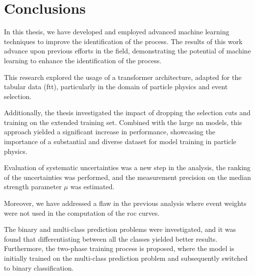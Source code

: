 \chapter*{Conclusions}
\label{ch:conclusions}

In this thesis, we have developed and employed advanced machine learning techniques to improve the identification of the
\tth process. The results of this work advance upon previous efforts in the field, demonstrating the potential of
machine learning to enhance the identification of the \tth process.

This research explored the usage of a transformer architecture, adapted for the tabular data (\gls{ftt}),
particularly in the domain of particle physics and event selection.

Additionally, the thesis investigated the impact of dropping the selection cuts and training on the extended training
set. Combined with the large \gls{nn} models, this approach yielded a significant increase in performance, showcasing
the importance of a substantial and diverse dataset for model training in particle physics.

Evaluation of systematic uncertainties was a new step in the \tth analysis, the ranking of the uncertainties was
performed, and the measurement precision on the median strength parameter $\mu$ was estimated.

Moreover, we have addressed a flaw in the previous analysis where event weights were not used in the computation of the
\gls{roc} curves.

The binary and multi-class prediction problems were investigated, and it was found that differentiating between all the
classes yielded better results. Furthermore, the two-phase training process is proposed, where the model is initially
trained on the multi-class prediction problem and subsequently switched to binary classification.